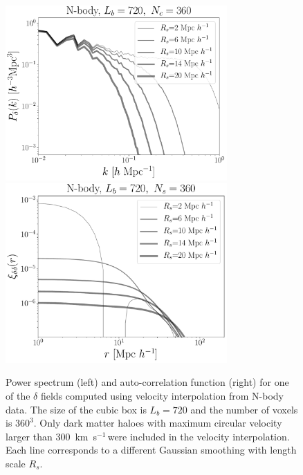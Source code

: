\documentclass[usenatbib]{mnras}
\newcommand{\kms}{\,{\rm km}\ s$^{-1}$\,}
\begin{document}
\begin{figure}
    \centering
    \includegraphics[width=240pt]{power_spectrum_nbody_720_360.pdf}
    \includegraphics[width=240pt]{corr_func_nbody_720_360.pdf}
    \caption{Power spectrum (left) and auto-correlation function (right) for one of the $\delta$ fields computed using velocity interpolation from N-body data.
    The size of the cubic box is $L_b=720$ \hMpc and the number of voxels is $360^3$.
    Only dark matter haloes with maximum circular velocity larger than $300$ \kms were included in the velocity interpolation.
    Each line corresponds to a different Gaussian smoothing with length scale $R_s$.}
    \label{fig:nbody}
\end{figure}
\end{document}
